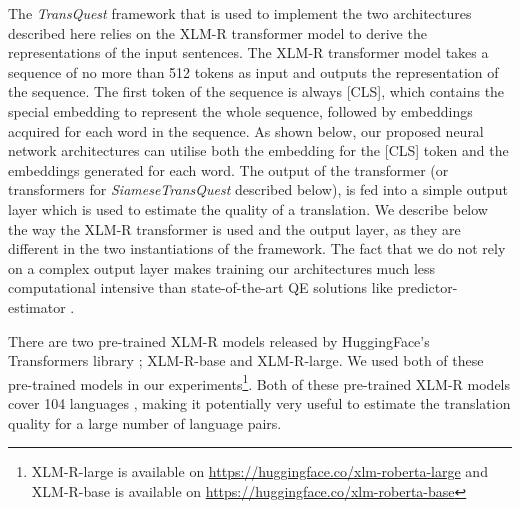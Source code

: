 The \textit{TransQuest} framework that is used to implement the two architectures described here relies on the XLM-R transformer model \cite{conneau-etal-2020-unsupervised} to derive the representations of the input sentences. The XLM-R transformer model takes a sequence of no more than 512 tokens as input and outputs the representation of the sequence. The first token of the sequence is always \textsc{[CLS]}, which contains the special embedding to represent the whole sequence, followed by embeddings acquired for each word in the sequence. As shown below, our proposed neural network architectures can utilise both the embedding for the \textsc{[CLS]} token and the embeddings generated for each word. The output of the transformer (or transformers for \textit{SiameseTransQuest} described below), is fed into a simple output layer which is used to estimate the quality of a translation. We describe below the way the XLM-R transformer is used and the output layer, as they are different in the two instantiations of the framework. The fact that we do not rely on a complex output layer makes training our architectures much less computational intensive than state-of-the-art QE solutions like predictor-estimator \cite{lee-2020-two, wang-etal-2018-alibaba}.

There are two pre-trained XLM-R models released by HuggingFace's Transformers library \cite{wolf-etal-2020-transformers}; XLM-R-base and XLM-R-large. We used both of these pre-trained models in our experiments\footnote{XLM-R-large is available on \url{https://huggingface.co/xlm-roberta-large} and XLM-R-base is available on \url{https://huggingface.co/xlm-roberta-base}}. Both of these pre-trained XLM-R models cover 104 languages \cite{conneau-etal-2020-unsupervised}, making it potentially very useful to estimate the translation quality for a large number of language pairs.

